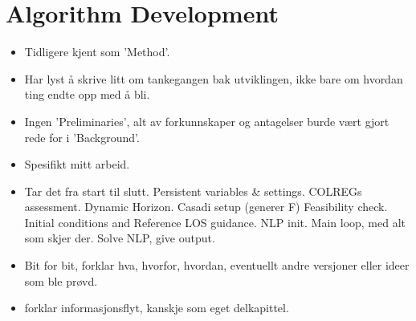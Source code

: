 \section{Algorithm Development}
\begin{itemize}
    \item Tidligere kjent som 'Method'.
    \item Har lyst å skrive litt om tankegangen bak utviklingen, ikke bare om hvordan ting endte opp med å bli.
    \item Ingen 'Preliminaries', alt av forkunnskaper og antagelser burde vært gjort rede for i 'Background'.
    \item Spesifikt mitt arbeid.
    \item Tar det fra start til slutt. 
    \subitem Persistent variables \& settings.
    \subitem COLREGs assessment.
    \subitem Dynamic Horizon.
    \subitem Casadi setup (generer F)
    \subitem Feasibility check.
    \subitem Initial conditions and Reference LOS guidance.
    \subitem NLP init.
    \subitem Main loop, med alt som skjer der.
    \subitem Solve NLP, give output.
    \item Bit for bit, forklar hva, hvorfor, hvordan, eventuellt andre versjoner eller ideer som ble prøvd.
    \item forklar informasjonsflyt, kanskje som eget delkapittel. 
\end{itemize}

\newpage